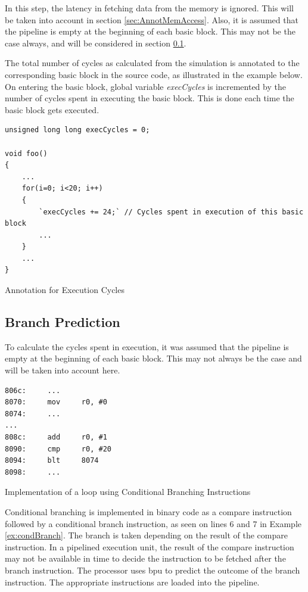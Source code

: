 In this step, the latency in fetching data from the memory is ignored. This will be taken into account in section \ref{sec:AnnotMemAccess}. Also, it is assumed that the pipeline is empty at the beginning of each basic block. This may not be the case always, and will be considered in section \ref{subsec:BranchPred}.

The total number of cycles as calculated from the simulation is annotated to the corresponding basic block in the source code, as illustrated in the example below. On entering the basic block, global variable \emph{execCycles} is incremented by the number of cycles spent in executing the basic block. This is done each time the basic block gets executed.

\begin{Example}
\begin{lstlisting}
unsigned long long execCycles = 0;

void foo()
{
    ...
    for(i=0; i<20; i++)
    {
        `execCycles += 24;` // Cycles spent in execution of this basic block
        ...
    }
    ...
}
\end{lstlisting}
\caption{Annotation for Execution Cycles}
\label{ex:annotExecCycles}
\end{Example}

\subsection{Branch Prediction}
\label{subsec:BranchPred}
To calculate the cycles spent in execution, it was assumed that the pipeline is empty at the beginning of each basic block. This may not always be the case and will be taken into account here.

\begin{Example}[h]
\begin{lstlisting}
806c:     ...
8070:     mov     r0, #0
8074:     ...
...
808c:     add     r0, #1
8090:     cmp     r0, #20
8094:     blt     8074
8098:     ...
\end{lstlisting}
\caption{Implementation of a loop using Conditional Branching Instructions}
\label{ex:condBranch}
\end{Example}

Conditional branching is implemented in binary code as a compare instruction followed by a conditional branch instruction, as seen on lines 6 and 7 in Example \ref{ex:condBranch}. The branch is taken depending on the result of the compare instruction. In a pipelined execution unit, the result of the compare instruction may not be available in time to decide the instruction to be fetched after the branch instruction. The processor uses \gls{bpu} to predict the outcome of the branch instruction. The appropriate instructions are loaded into the pipeline.

